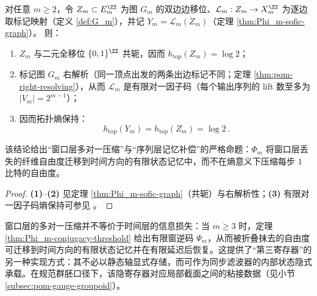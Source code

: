 \begin{corollary}\label{cor:Phi_m-entropy-no-drop}
对任意 \(m\ge 2\)，令 \(Z_m\subset E_m^{\ZZ}\) 为图 \(G_m\) 的双边边移位、\(\mathcal{L}_m:Z_m\to X_m^{\ZZ}\) 为逐边取标记映射（定义 \ref{def:G_m}），并记 \(Y_m=\mathcal{L}_m(Z_m)\)（定理 \ref{thm:Phi_m-sofic-graph}）。
则：
\begin{enumerate}
  \item \(Z_m\) 与二元全移位 \(\{0,1\}^{\ZZ}\) 共轭，因而 \(h_{\mathrm{top}}(Z_m)=\log 2\)；
  \item 标记图 \(G_m\) 右解析（同一顶点出发的两条出边标记不同；定理 \ref{thm:pom-right-resolving}），从而 \(\mathcal{L}_m\) 是有限对一因子码（每个输出序列的 lift 数至多为 \(|V_m|=2^{m-1}\)）；
  \item 因而拓扑熵保持：
  \[
  \boxed{\ h_{\mathrm{top}}(Y_m)=h_{\mathrm{top}}(Z_m)=\log 2\ }.
  \]
\end{enumerate}
该结论给出“窗口层多对一压缩”与“序列层记忆补偿”的严格命题：\(\Phi_m\) 将窗口层丢失的纤维自由度迁移到时间方向的有限状态记忆中，而不在熵意义下压缩每步 \(1\) 比特的自由度。
\end{corollary}
\begin{proof}
\textbf{(1)}--\textbf{(2)} 见定理 \ref{thm:Phi_m-sofic-graph}（共轭）与右解析性；\textbf{(3)} 有限对一因子码熵保持可参见 \cite{LindMarcus1995,Kitchens1998SymbolicDynamics}。
\end{proof}

\begin{remark}[时间记忆作为隐寄存器]\label{rem:Phi-m-memory-implicit-register}
窗口层的多对一压缩并不等价于时间层的信息损失：当 $m\ge 3$ 时，定理 \ref{thm:Phi_m-conjugacy-threshold} 给出有限窗逆码 $\Psi_m$，从而被折叠抹去的自由度可迁移到时间方向的有限状态记忆并在有限延迟后恢复。这提供了“第三寄存器”的另一种实现方式：其不必以静态轴显式存储，而可作为同步滤波器的内部状态隐式承载。在规范群胚口径下，该隐寄存器对应局部截面之间的粘接数据（见小节 \ref{subsec:pom-gauge-groupoid}）。
\end{remark}
